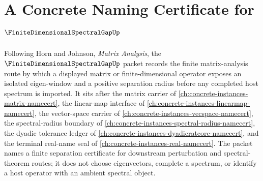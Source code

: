 \chapter{A Concrete Naming Certificate for $\FiniteDimensionalSpectralGapUp$}
\label{ch:concrete-instances-finite-dimensional-spectral-gap-namecert}

Following Horn and Johnson, \emph{Matrix Analysis}, the $\FiniteDimensionalSpectralGapUp$ packet records the finite matrix-analysis route by which a displayed matrix or finite-dimensional operator exposes an isolated eigen-window and a positive separation radius before any completed host spectrum is imported. It sits after the matrix carrier of \autoref{ch:concrete-instances-matrix-namecert}, the linear-map interface of \autoref{ch:concrete-instances-linearmap-namecert}, the vector-space carrier of \autoref{ch:concrete-instances-vecspace-namecert}, the spectral-radius boundary of \autoref{ch:concrete-instances-spectral-radius-namecert}, the dyadic tolerance ledger of \autoref{ch:concrete-instances-dyadicratcore-namecert}, and the terminal real-name seal of \autoref{ch:concrete-instances-real-namecert}. The packet names a finite separation certificate for downstream perturbation and spectral-theorem routes; it does not choose eigenvectors, complete a spectrum, or identify a host operator with an ambient spectral object.

